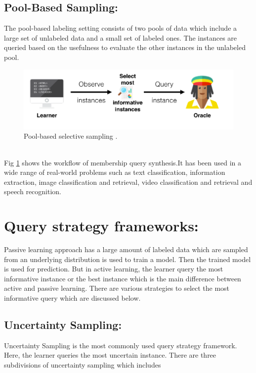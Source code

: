 \subsection{Pool-Based Sampling:}
	The pool-based labeling setting consists of two pools of data which include a large set of unlabeled data and a small set of labeled ones. The instances are queried based on the usefulness to evaluate the other instances in the unlabeled pool.\\
\begin{figure}[h!]
	\centering
	\includegraphics[scale=0.4]{images/pool_based}
	\caption{Pool-based selective sampling \cite{active_learning_datacamp}.}
	\label{pool_based}
\end{figure}\\
Fig \ref{pool_based} shows the workflow of membership query synthesis.It has been used in a wide range of real-world problems such as text classification, information extraction, image classification and retrieval, video classification and retrieval and speech recognition. \cite{Settles2010}

\section{Query strategy frameworks:}
	
Passive learning approach has a large amount of labeled data which are sampled from an underlying distribution is used to train a model. Then the trained model is used for prediction. But in active learning, the learner query the most informative instance or the best instance which is the main difference between active and passive learning. There are various strategies to select the most informative query which are discussed below. \cite{Settles2010}

\subsection{Uncertainty Sampling:}
   Uncertainty Sampling is the most commonly used query strategy framework. Here, the learner queries the most uncertain instance. There are three subdivisions of uncertainty sampling which includes 
